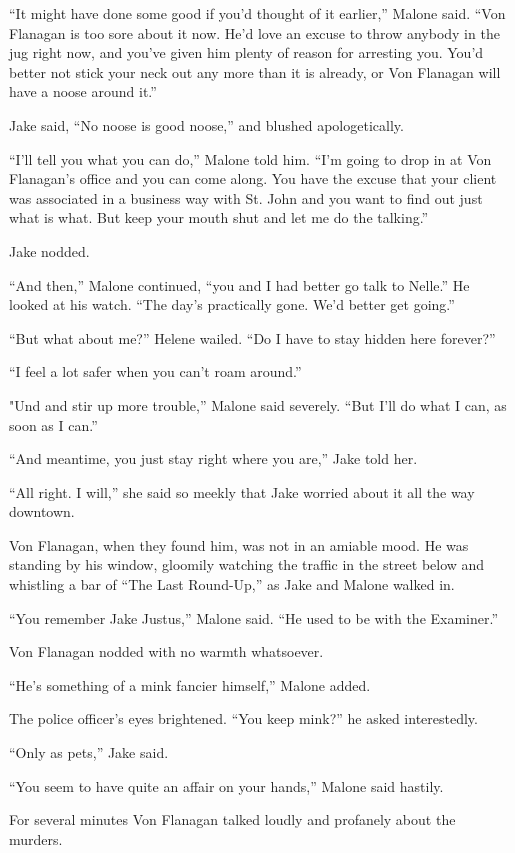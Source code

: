 \documentclass{novel}
\begin{document}
“It might have done some good if you’d thought of it earlier,” Malone said. “Von Flanagan is too sore about it now. He’d love an excuse to throw anybody in the jug right now, and you’ve given him plenty of reason for arresting you. You’d better not stick your neck out any more than it is already, or Von Flanagan will have a noose around it.”

Jake said, “No noose is good noose,” and blushed apologetically.

“I’ll tell you what you can do,” Malone told him. “I’m going to drop in at Von Flanagan’s office and you can come along. You have the excuse that your client was associated in a business way with St. John and you want to find out just what is what. But keep your mouth shut and let me do the talking.”

Jake nodded.

“And then,” Malone continued, “you and I had better go talk to Nelle.” He looked at his watch. “The day’s practically gone. We’d better get going.”

“But what about me?” Helene wailed. “Do I have to stay hidden here forever?”

“I feel a lot safer when you can’t roam around.”

"Und and stir up more trouble,” Malone said severely. “But I’ll do what I can, as soon as I can.”

“And meantime, you just stay right where you are,” Jake told her.

“All right. I will,” she said so meekly that Jake worried about it all the way downtown.

Von Flanagan, when they found him, was not in an amiable mood. He was standing by his window, gloomily watching the traffic in the street below and whistling a bar of “The Last Round-Up,” as Jake and Malone walked in.

“You remember Jake Justus,” Malone said. “He used to be with the Examiner.”

Von Flanagan nodded with no warmth whatsoever.

“He’s something of a mink fancier himself,” Malone added.

The police officer’s eyes brightened. “You keep mink?” he asked interestedly.

“Only as pets,” Jake said.

“You seem to have quite an affair on your hands,” Malone said hastily.

For several minutes Von Flanagan talked loudly and profanely about the murders.
\end{document}
